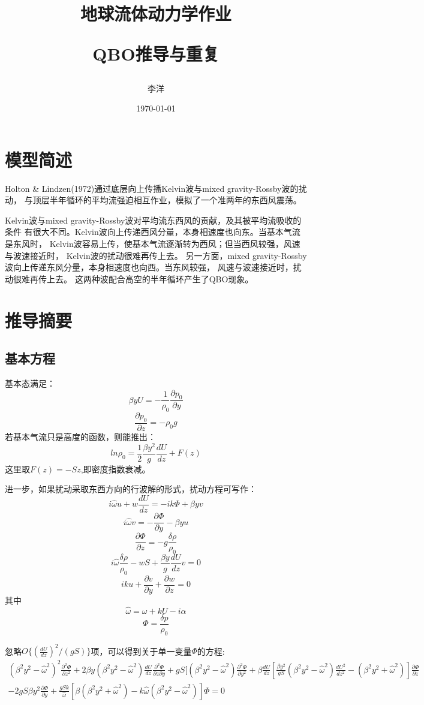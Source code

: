 \documentclass[UTF8]{ctexart}
\title{地球流体动力学作业\\[2ex]\begin{large} QBO推导与重复 \end{large} }
\author{李洋}
\date{\today}
\begin{document}
	\maketitle
	\section{模型简述}
	Holton \& Lindzen(1972)通过底层向上传播Kelvin波与mixed gravity-Rossby波的扰动，
	与顶层半年循环的平均流强迫相互作业，模拟了一个准两年的东西风震荡。
	
	Kelvin波与mixed gravity-Rossby波对平均流东西风的贡献，及其被平均流吸收的条件
	有很大不同。Kelvin波向上传递西风分量，本身相速度也向东。当基本气流是东风时，
	Kelvin波容易上传，使基本气流逐渐转为西风；但当西风较强，风速与波速接近时，
	Kelvin波的扰动很难再传上去。
	另一方面，mixed gravity-Rossby波向上传递东风分量，本身相速度也向西。当东风较强，
	风速与波速接近时，扰动很难再传上去。
	这两种波配合高空的半年循环产生了QBO现象。
	\section{推导摘要}
	\subsection{基本方程}
	基本态满足：
	\[\beta yU=-\frac{1}{\rho_0}\frac{\partial p_0}{\partial y}\]
	\[\frac{\partial p_0}{\partial z}=-\rho_0g\]
	若基本气流只是高度的函数，则能推出：
	\[ln\rho_0=\frac{1}{2}\frac{\beta y^2}{g}\frac{dU}{dz}+F(z)\]
	这里取$F(z)=-Sz$,即密度指数衰减。
	
	进一步，如果扰动采取东西方向的行波解的形式，扰动方程可写作：
	\[i\widehat{\omega}u+w\frac{dU}{dz}=-ik\Phi+\beta yv\]
	\[i\widehat{\omega}v=-\frac{\partial\Phi}{\partial y}-\beta yu\]
	\[\frac{\partial \Phi}{\partial z}=-g\frac{\delta\rho}{\rho_0}\]
	\[i\widehat{\omega}\frac{\delta\rho}{\rho_0}-wS+\frac{\beta y}{g}\frac{dU}{dz}v=0\]
	\[iku+\frac{\partial v}{\partial y}+\frac{\partial w}{\partial z}=0\]
	其中
	\[\widehat{\omega}=\omega +kU-i\alpha\]
	\[\Phi=\frac{\delta p}{\rho_0}\]
	
	忽略$O\{(\frac{dU}{dz})^2/(gS)\}$项，可以得到关于单一变量$\Phi$的方程:
	\begin{align} \label{eq1}
	\nonumber(\beta^2y^2-{\widehat{\omega}}^2)^2\frac{\partial^2\Phi}{\partial z^2}+
	2\beta y(\beta^2y^2-{\widehat{\omega}}^2)\frac{dU}{dz}
	\frac{\partial^2\Phi}{\partial z\partial y}+gS[(\beta^2y^2-{\widehat{\omega}}^2)
	\frac{\partial^2\Phi}{\partial y^2}+\beta\frac{dU}{dz}[\frac{\beta y^2}{gS}
	(\beta^2y^2-{\widehat{\omega}}^2)\frac{dU^2}{dz^2}-(\beta^2y^2+{\widehat{\omega}}
	^2)]\frac{\partial\Phi}{\partial z}\\-2gS\beta y^2\frac{\partial\Phi}{\partial y}+
	\frac{gSk}{\widehat{\omega}}[\beta(\beta^2y^2+{\widehat{\omega}}^2)-k\widehat
	{\omega}(\beta^2y^2-{\widehat{\omega}}^2)]\Phi=0\
	\end{align}
	
\end{document}
